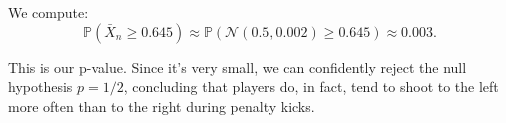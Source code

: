 \documentclass[11pt]{article}
\begin{document}
We compute:
\[
\mathbb P(\bar X_n \geq 0.645) \approx \mathbb P(\mathcal N(0.5, 0.002) \geq 0.645) \approx 0.003.
\]

This is our p-value. Since it's very small, we can confidently reject the null hypothesis $p = 1/2$, concluding that players do, in fact, tend to shoot to the left more often than to the right during penalty kicks.
\end{document}
